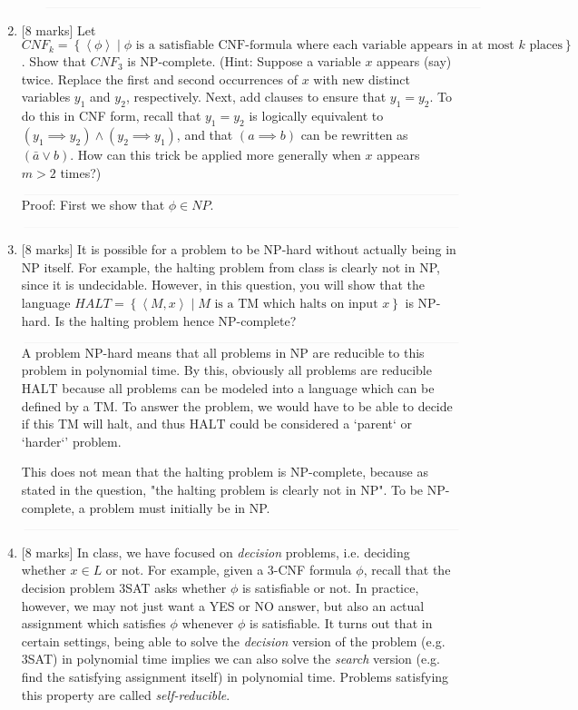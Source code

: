 \documentclass{article}
\newcommand{\class}[1]{\text{#1}}
\newcommand{\set}[1]{{\left\{#1\right\}}}    %
\newcommand{\enc}[1]{\left<#1\right>}
\begin{document}
\begin{enumerate}
\begin{enumerate}
            $\textcolor[RGB]{220,220,220}{\rule{\linewidth}{0.2pt}}$


    \end{enumerate}
    \item {[8 marks]} Let $CNF_k=\set{\enc{\phi}\mid\phi\text{ is a satisfiable CNF-formula where each variable appears in at most }k\text{ places}}$. Show that ${CNF}_3$ is NP-complete. (Hint: Suppose a variable $x$ appears (say) twice. Replace the first and second occurrences of $x$ with new distinct variables $y_1$ and $y_2$, respectively. Next, add clauses to ensure that $y_1=y_2$. To do this in CNF form, recall that $y_1=y_2$ is logically equivalent to $(y_1\implies y_2)\wedge(y_2\implies y_1)$, and that $(a\implies b)$ can be rewritten as $(\bar{a}\vee {b})$. How can this trick be applied more generally when $x$ appears $m>2$ times?)


            $\textcolor[RGB]{220,220,220}{\rule{\linewidth}{0.2pt}}$
            Proof: First we show that $\phi \in NP$.

            $\textcolor[RGB]{220,220,220}{\rule{\linewidth}{0.2pt}}$

    \item {[8 marks]} It is possible for a problem to be NP-hard without actually being in NP itself. For example, the halting problem from class is clearly not in NP, since it is undecidable. However, in this question, you will show that the language $HALT=\set{\enc{M,x}\mid M\text{ is a TM which halts on input }x}$ is NP-hard. Is the halting problem hence NP-complete?


            $\textcolor[RGB]{220,220,220}{\rule{\linewidth}{0.2pt}}$
            A problem NP-hard means that all problems in NP are reducible to this problem in polynomial time. By this, obviously all problems are reducible $\class{HALT}$ because all problems can be modeled into a language which can be defined by a TM. To answer the problem, we would have to be able to decide if this TM will halt, and thus $\class{HALT}$ could be considered a `parent` or `harder`' problem.

            This does not mean that the halting problem is NP-complete, because as stated in the question, "the halting problem is clearly not in NP". To be NP-complete, a problem must initially be in NP.

            $\textcolor[RGB]{220,220,220}{\rule{\linewidth}{0.2pt}}$

    \item {[8 marks]} In class, we have focused on \emph{decision} problems, i.e. deciding whether $x\in L$ or not. For example, given a 3-CNF formula $\phi$, recall that the decision problem 3SAT asks whether $\phi$ is satisfiable or not. In practice, however, we may not just want a YES or NO answer, but also an actual assignment which satisfies $\phi$ whenever $\phi$ is satisfiable. It turns out that in certain settings, being able to solve the \emph{decision} version of the problem (e.g. 3SAT) in polynomial time implies we can also solve the \emph{search} version (e.g. find the satisfying assignment itself) in polynomial time. Problems satisfying this property are called \emph{self-reducible}.


\end{enumerate}
\end{document}
